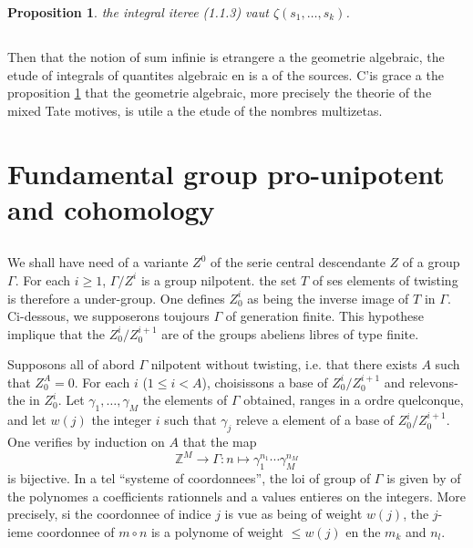 \documentclass[11pt,a4paper]{article}
\theoremstyle{plain}
\newtheorem{proposition}[theorem]{Proposition}
\theoremstyle{definition}
\newcommand{\Z}{\mathbb{Z}}
\begin{document}
\begin{proposition}\label{prop:1.2}
the integral iteree (1.1.3) vaut $\zeta(s_1,\ldots,s_k)$.
\end{proposition}

\subsection{}\label{ssec:1.3}

Then that the notion of sum infinie is etrangere a the geometrie algebraic, the etude of integrals of quantites algebraic en is a of the sources. C'is grace a the proposition \ref{prop:1.2} that the geometrie algebraic, more precisely the theorie of the mixed Tate motives, is utile a the etude of the nombres multizetas.

\section{Fundamental group pro-unipotent and cohomology}\label{sec:2}

\subsection{}\label{ssec:2.1}

We shall have need of a variante $Z^0$ of the serie central descendante $Z$ of a group $\Gamma$. For each $i \geq 1$, $\Gamma/Z^i$ is a group nilpotent. the set $T$ of ses elements of twisting is therefore a under-group. One defines $Z^i_0$ as being the inverse image of $T$ in $\Gamma$. Ci-dessous, we supposerons toujours $\Gamma$ of generation finite. This hypothese implique that the $Z^i_0/Z^{i+1}_0$ are of the groups abeliens libres of type finite.

Supposons all of abord $\Gamma$ nilpotent without twisting, i.e. that there exists $A$ such that $Z^A_0 = 0$. For each $i$ ($1 \leq i < A$), choisissons a base of $Z^i_0/Z^{i+1}_0$ and relevons-the in $Z^i_0$. Let $\gamma_1,\ldots,\gamma_M$ the elements of $\Gamma$ obtained, ranges in a ordre quelconque, and let $w(j)$ the integer $i$ such that $\gamma_j$ releve a element of a base of $Z^i_0/Z^{i+1}_0$. One verifies by induction on $A$ that the map
\[
\Z^M \to \Gamma : n \mapsto \gamma_1^{n_1} \cdots \gamma_M^{n_M}
\]
is bijective. In a tel ``systeme of coordonnees'', the loi of group of $\Gamma$ is given by of the polynomes a coefficients rationnels and a values entieres on the integers. More precisely, si the coordonnee of indice $j$ is vue as being of weight $w(j)$, the $j$-ieme coordonnee of $m \circ n$ is a polynome of weight $\leq w(j)$ en the $m_k$ and $n_l$.
\end{document}
